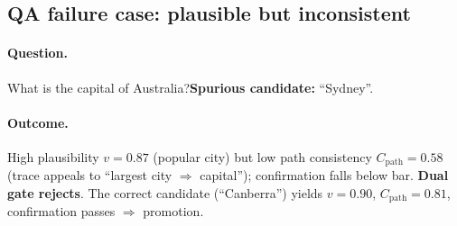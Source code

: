 \documentclass{article}
\begin{document}
\subsection{QA failure case: plausible but inconsistent}
\paragraph{Question.} What is the capital of Australia?\quad \textbf{Spurious candidate:} ``Sydney''.
\paragraph{Outcome.} High plausibility $v{=}0.87$ (popular city) but low path consistency $C_{\text{path}}{=}0.58$ (trace appeals to ``largest city $\Rightarrow$ capital''); confirmation falls below bar. \textbf{Dual gate rejects}. The correct candidate (``Canberra'') yields $v{=}0.90$, $C_{\text{path}}{=}0.81$, confirmation passes $\Rightarrow$ promotion.
\end{document}

